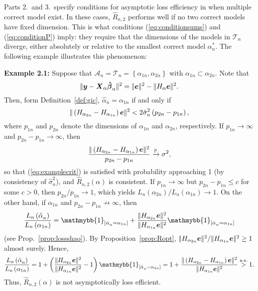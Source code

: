 \documentclass[11pt, letter paper]{article}
\newcommand{\1}{\mathmybb{1}}
\newcommand{\0}{\emptyset}
\newcommand{\prob}{\mathbb{P}}
\newcommand{\paren}[1]{\left(#1 \right)}
\newcommand{\sqbr}[1]{\left[#1 \right]}
\newcommand{\set}[1]{\left\{ #1 \right\}}
\newcommand{\norm}[1]{|\hspace{-1pt}|#1 |\hspace{-1pt}|}
\newcommand{\normsq}[1]{\norm{#1}^{2}}
\newcommand{\ind}[1]{\mathmybb{1}_{\sqbr{#1}}}
\newcommand{\Acal}{\mathcal{A}_{n}}
\newcommand{\Tcal}{\mathcal{T}_{n}}
\newcommand{\X}{\boldsymbol{X}}
\newcommand{\y}{\boldsymbol{y}}
\newcommand{\e}{\boldsymbol{e}}
\newcommand{\bbetahat}{\boldsymbol{\hat{\beta}}}
\newcommand{\Loss}[1]{L_{n}\paren{#1}}
\newcommand{\Rhat}[2]{\hat{R}_{n, #1}\paren{#2}}
\newcommand{\alphahat}[1]{\hat{\alpha}^{#1}}
\newcommand{\sigmahat}{\hat{\sigma}^{2}_{n}}
\begin{document}
Parts 2.\ and 3.\ specify conditions for asymptotic loss efficiency in when multiple correct model exist. In these cases, \(\hat{R}_{n,2}\) performs well if no two correct models have fixed dimension. This is what conditions (\ref{eq:conditionsums}) and (\ref{eq:conditionP}) imply: they require that the dimensions of the models in \(\Tcal\) diverge, either absolutely or relative to the smallest correct model \(\alpha^{*}_{n}\). The following example illustrates this phenomenon:

\begin{myproofbox}
    \textbf{Example 2.1:} Suppose that \(\Acal = \Tcal = \set{\alpha_{1n}, \alpha_{2n}}\) with \(\alpha_{1n}\subset\alpha_{2n}\). Note that 
    \[\normsq{\y - \X_{\alpha}\bbetahat_{\alpha}} = \normsq{\e} - \normsq{H_{\alpha}\e}.\]
    Then, form Definition~\ref{def:gic}, \(\alphahat{}_{n} = \alpha_{1n}\) if and only if
    \begin{equation}\label{eq:examplecrit}
    \normsq{\paren{H_{\alpha_{2n}} - H_{\alpha_{1n}}}\e} < 2\sigmahat\paren{p_{2n}-p_{1n}},
    \end{equation}
    where \(p_{1n}\) and \(p_{2n}\) denote the dimensions of \(\alpha_{1n}\) and \(\alpha_{2n}\), respectively. If \(p_{1n}\to\infty\) and \(p_{2n} - p_{1n}\to\infty\), then
    \[\frac{\normsq{\paren{H_{\alpha_{2n}} - H_{\alpha_{1n}}}\e}}{p_{2n} - p_{1n}}\xrightarrow{\prob}\sigma^{2},\]
    so that (\ref{eq:examplecrit}) is satisfied with probability approaching 1 (by consistency of \(\sigmahat\)), and \(\Rhat{2}{\alpha}\) is consistent. If \(p_{1n}\to\infty\) but \(p_{2n} - p_{1n}\leq c\) for some \(c>0\), then \(p_{2n} / p_{1n}\to 1\), which yields \(\Loss{\alpha_{2n}}/\Loss{\alpha_{1n}} \to 1\). On the other hand, if \(\alpha_{1n}\) and \(p_{2n} - p_{1n}\not\to\infty\), then
    \[\frac{\Loss{\alphahat{}_{n}}}{\Loss{\alpha_{1n}}} = \ind{\alphahat{}_{n}=\alpha_{1n}} + \frac{\normsq{H_{\alpha_{2n}}\e}}{\normsq{H_{\alpha_{1n}}\e}}\ind{\alphahat{}_{n}=\alpha_{1n}}\]
    (see Prop.~\ref{prop:lossshao}). By Proposition~\ref{prop:Ropt}, \({\normsq{H_{\alpha_{2n}}\e}}/{\normsq{H_{\alpha_{1n}}\e}}\geq1\) almost surely. Hence,
    \[\frac{\Loss{\alphahat{}_{n}}}{\Loss{\alpha_{1n}}} = 1 + \paren{\frac{\normsq{H_{\alpha_{2n}}\e}}{\normsq{H_{\alpha_{1n}}\e}} - 1}\ind{\alphahat{}_{n}=\alpha_{1n}} = 1 + \frac{\normsq{\paren{H_{\alpha_{2n}} - H_{\alpha_{1n}}}\e}}{\normsq{H_{\alpha_{1n}}\e}} \stackrel{\mathrm{a.s.}}{>} 1.\]
    Thus, \(\Rhat{2}{\alpha}\) is not asymptotically loss efficient.    
\end{myproofbox}
\end{document}
